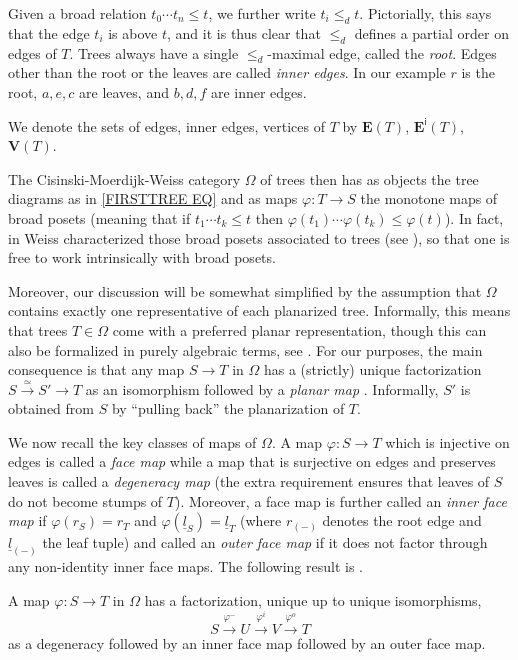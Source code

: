 \documentclass[a4paper,10pt
,draft
]{article}%
\begin{document}
Given a broad relation $t_0 \cdots t_n \leq t$,
we further write $t_i \leq_d t$.
Pictorially, this says that the edge $t_i$ is above $t$,
and it is thus clear that $\leq_d$ defines a partial order on edges of $T$.
Trees always have a single $\leq_d$-maximal edge, called the \textit{root}. Edges other than the root or the leaves are called \textit{inner edges}. In our example $r$ is the root, $a,e,c$ are leaves, and $b,d,f$ are inner edges. 

We denote the sets of edges, inner edges, vertices of $T$ by 
$\boldsymbol{E}(T)$, $\boldsymbol{E}^{\mathsf{i}}(T)$,
$\boldsymbol{V}(T)$.

The Cisinski-Moerdijk-Weiss category $\Omega$ of trees then has as objects the tree diagrams as in \eqref{FIRSTTREE EQ}
and as maps $\varphi \colon T \to S$ the monotone maps of broad posets
(meaning that if $t_1 \cdots t_k \leq t$ then
$\varphi(t_1) \cdots \varphi(t_k) \leq \varphi(t)$).
In fact, in \cite{Wei12} Weiss characterized 
those broad posets associated to trees (see \cite[Defs. 5.1 and 5.9]{Per17}),
so that one is free to work intrinsically with broad posets.

Moreover, our discussion will be somewhat simplified by the assumption that $\Omega$
contains exactly one representative of each planarized tree.
Informally, this means that trees $T \in \Omega$
come with a preferred planar representation,
though this can also be formalized in purely algebraic terms, see \cite[\S 3.1]{BP17}.
For our purposes, the main consequence is that any map 
$S \to T$ in $\Omega$ has a (strictly) unique factorization
$S \xrightarrow{\simeq} S' \to T$ as an isomorphism followed by a \textit{planar map} \cite[Prop. 3.21]{BP17}. 
Informally, $S'$ is obtained from $S$
by ``pulling back'' the planarization of $T$.

We now recall the key classes of maps of $\Omega$.
A map $\varphi \colon S \to T$ which is injective on edges is called a \textit{face map}
while a map that is surjective on edges and preserves leaves is called a \textit{degeneracy map}
(the extra requirement ensures that leaves of $S$ do not become stumps of $T$).
Moreover, a face map is further called an \textit{inner face map}
if $\varphi(r_S) = r_T$ and 
$\varphi(\underline{l}_S) = \underline{l}_T$ 
(where $r_{(-)}$ denotes the root edge and $\underline{l}_{(-)}$ the leaf tuple)
and called an \textit{outer face map} if it does not factor through any non-identity inner face maps.
The following result is \cite[Cor. 3.32]{BP17}.
\begin{proposition}\label{UNIQUEFACT PROP}
	A map $\varphi \colon S \to T$ in $\Omega$ has a factorization, unique up to unique isomorphisms,
\[
	S \xrightarrow{\varphi^{-}}
	U \xrightarrow{\varphi^{i}}
	V \xrightarrow{\varphi^{o}}
	T	
\]
as a degeneracy followed by an inner face map followed by an outer face map.
\end{proposition}
\end{document}
